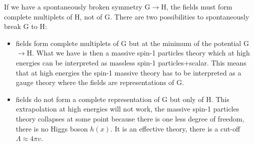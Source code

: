\documentclass[../main.tex]{subfiles}
\begin{document}
If we have a spontaneously broken symmetry G$\to$H, the fields must form complete multiplets of H, not of G. There are two possibilities to spontaneously break G to H:
\begin{itemize}
    \item fields form complete multiplets of G but at the minimum of the potential G$\to$H. What we have is then a massive spin-1 particles theory which at high energies can be interpreted as massless spin-1 particles+scalar. This means that at high energies the spin-1 massive theory has to be interpreted as a gauge theory where the fields are representations of G.
    \item fields do not form a complete representation of G but only of H. This extrapolation at high energies will not work, the massive spin-1 particles theory collapses at some point because there is one less degree of freedom, there is no Higgs boson $h(x)$. It is an effective theory, there is a cut-off $\Lambda\approx4\pi v$.
\end{itemize}
\end{document}
